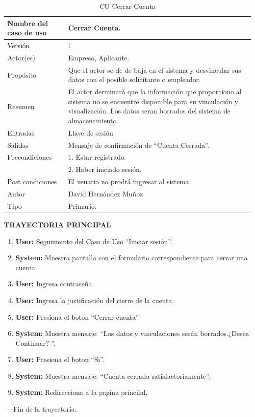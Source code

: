 \begin{table}[h]			
        \begin{center}			
\begin{tabular}{|l|p{11cm}|} \hline			
Nombre del caso de uso	&	Cerrar Cuenta.	\\ \hline
Versión	&	1	\\ \hline
Actor(es)	&	Empresa, Aplicante.	\\ \hline
Propósito	&	Que el actor se de de baja en el sistema y desvincular sus datos con el posible solicitante o empleador. 	\\ \hline
Resumen	&	El actor derminará que la información que proporciono al sistema no se encuentre disponible para su vinculación y visualización. Los datos seran borrados del sistema de almacenamiento.	\\ \hline
Entradas	&	Llave de sesión	\\ \hline
			
			
			
			
Salidas	&	Mensaje de confirmación de “Cuenta Cerrada”.	\\ \hline
Precondiciones	&	1. Estar registrado.\\
& 2. Haber iniciado sesión.\\ \hline
Post condiciones	&	El usuario no prodrá ingresar al sistema.	\\ \hline
Autor	&	David Hernández Muñoz	\\ \hline
Tipo	&	Primario.	\\ \hline
\end{tabular}			
        \caption	{	CU Cerrar Cuenta	}
        \label	{tabla	5	}
        \end{center}			
\end{table}			

\textbf{TRAYECTORIA PRINCIPAL}			
\begin{enumerate}			
\item \textbf{	User: 	}	Seguimeinto del Caso de Uso “Iniciar  sesión”.
\item \textbf{	System: 	}	Muestra pantalla con el formulario correspondiente para cerrar una cuenta.
\item \textbf{	User: 	}	Ingresa contraseña
\item \textbf{	User: 	}	Ingresa la justificación del cierre de la cuenta.
\item \textbf{	User: 	}	Presiona el boton  “Cerrar cuenta”.
\item \textbf{	System: 	}	Muestra mensaje: “Los datos y vinculaciones serán borrados.¿Desea Continuar? ”.
\item \textbf{	User: 	}	Presiona el boton  “Si”.
\item \textbf{	System: 	}	Muestra mensaje: “Cuenta cerrada satisfactoriamente”.
\item \textbf{	System: 	}	Redirecciona a la pagina princilal.
\end{enumerate}			
----Fin de la trayectoria.			




